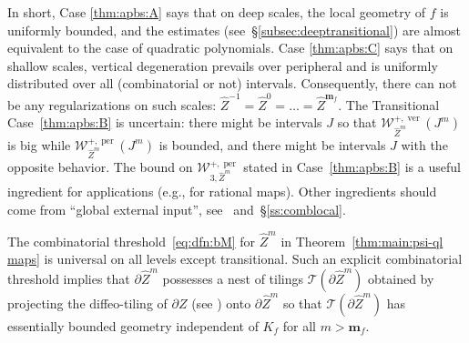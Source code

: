 \documentclass{amsart}
\newcommand{\1}{{\mathbb 1 }}
\newcommand{\Width}{{\mathcal W}}
\newcommand\TT{\mathcal{T}}
\newcommand{\wZ}{{\widehat Z}}
\newcommand{\bbm}{{\mathbf m}}
\newcommand\ver{{\operatorname{ver}}}
\newcommand\per{{\operatorname{per}}}
\theoremstyle{remark}
\numberwithin{equation}{section}
\theoremstyle{definition}
\begin{document}
In short, Case \ref{thm:apbs:A} says that on deep scales, the local geometry of $f$ is uniformly bounded, and the estimates (see~\S\ref{subsec:deeptransitional}) are almost equivalent to the case of quadratic polynomials. Case \ref{thm:apbs:C} says that on shallow scales, vertical degeneration prevails over peripheral and is uniformly distributed over all (combinatorial or not) intervals. Consequently, there can not be any regularizations on such scales: $\wZ^{-1}=\wZ^0=\dots =\wZ^{\bbm_f}$. The Transitional Case~\ref{thm:apbs:B} is uncertain: there might be intervals $J$ so that $\Width_{\wZ^m}^{+,\ver} (J^m)$ is big while $\Width_{\wZ^m}^{+,\per} (J^m)$ is bounded, and there might be intervals $J$ with the opposite behavior. The bound on $\Width_{3,\wZ^m}^{+,\per}$ stated in Case~\ref{thm:apbs:B} is a useful ingredient for applications (e.g., for rational maps). Other ingredients should come from ``global external input'', see~\cite{DL:HypComp} and~\S\ref{ss:comblocal}.



The combinatorial threshold~\eqref{eq:dfn:bM} for $\wZ^m$ in Theorem~\ref{thm:main:psi-ql maps} is universal on all levels except transitional. Such an explicit combinatorial threshold implies that $\partial \wZ^m$ possesses a nest of tilings $\TT(\partial \wZ^m)$ obtained by projecting the diffeo-tiling of $\partial Z$ (see \cite[\S2.1.6]{DL22}) onto $\partial \wZ^m$ so that $\TT(\partial \wZ^m)$ has essentially bounded geometry independent of $K_f$ for all $m>\bbm_f$. 
\end{document}
